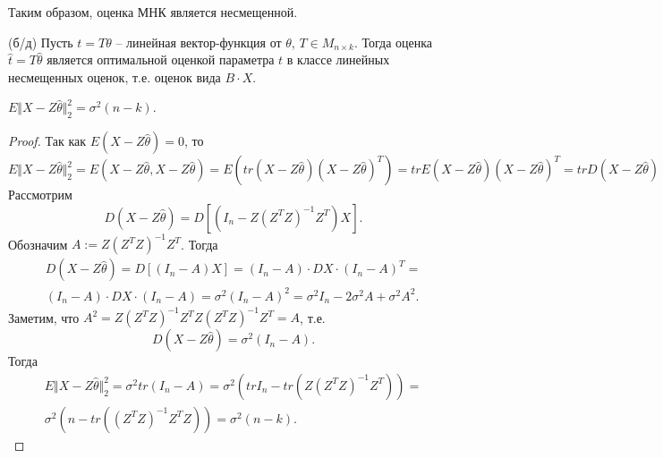 \begin{note}
    Таким образом, оценка МНК является несмещенной.
\end{note}
\begin{theorem}
    (б/д) Пусть $\displaystyle t=T\theta $ -- линейная вектор-функция от $\displaystyle \theta $, $\displaystyle T\in M_{n\times k}$. Тогда оценка $\displaystyle \hat{t} =T\hat{\theta }$ является оптимальной оценкой параметра $\displaystyle t$ в классе линейных несмещенных оценок, т.е. оценок вида $\displaystyle B\cdotp X$.
\end{theorem}
\begin{lemma}
    $\displaystyle E\Vert X-Z\hat{\theta }\Vert _{2}^{2} =\sigma ^{2}( n-k)$.
\end{lemma}
\begin{proof}
    Так как $\displaystyle E( X-Z\hat{\theta }) =0$, то 
    \begin{equation*}
        \displaystyle E\Vert X-Z\hat{\theta }\Vert _{2}^{2}=E(X-Z \hat{\theta}, X-Z \hat{\theta})=E(tr (X-Z \hat{\theta})(X-Z \hat{\theta})^T)=tr E(X-Z \hat{\theta})(X-Z \hat{\theta})^T =trD( X-Z\hat{\theta })
    \end{equation*} 
    Рассмотрим
    \begin{equation*}
        D( X-Z\hat{\theta }) =D\left[\left( I_{n} -Z\left( Z^{T} Z\right)^{-1} Z^{T}\right) X\right] .
    \end{equation*}
    Обозначим $\displaystyle A:=Z\left( Z^{T} Z\right)^{-1} Z^{T}$. Тогда
    \begin{gather*}
        D( X-Z\hat{\theta }) =D[( I_{n} -A) X] =( I_{n} -A) \cdotp DX\cdotp ( I_{n} -A)^{T} =\\
        ( I_{n} -A) \cdotp DX\cdotp ( I_{n} -A) =\sigma ^{2}( I_{n} -A)^{2} =\sigma ^{2} I_{n} -2\sigma ^{2} A+\sigma ^{2} A^{2} .
    \end{gather*}
    Заметим, что $\displaystyle A^{2} =Z\left( Z^{T} Z\right)^{-1} Z^{T} Z\left( Z^{T} Z\right)^{-1} Z^{T} =A$, т.е.
    \begin{equation*}
        D( X-Z\hat{\theta }) =\sigma ^{2}( I_{n} -A) .
    \end{equation*}
    Тогда
    \begin{gather*}
        E\Vert X-Z\hat{\theta }\Vert _{2}^{2} =\sigma ^{2} tr( I_{n} -A) =\sigma ^{2}\left( trI_{n} -tr\left( Z\left( Z^{T} Z\right)^{-1} Z^{T}\right)\right) =\\
        \sigma ^{2}\left( n-tr\left(\left( Z^{T} Z\right)^{-1} Z^{T} Z\right)\right) =\sigma ^{2}( n-k) .
    \end{gather*}
\end{proof}

